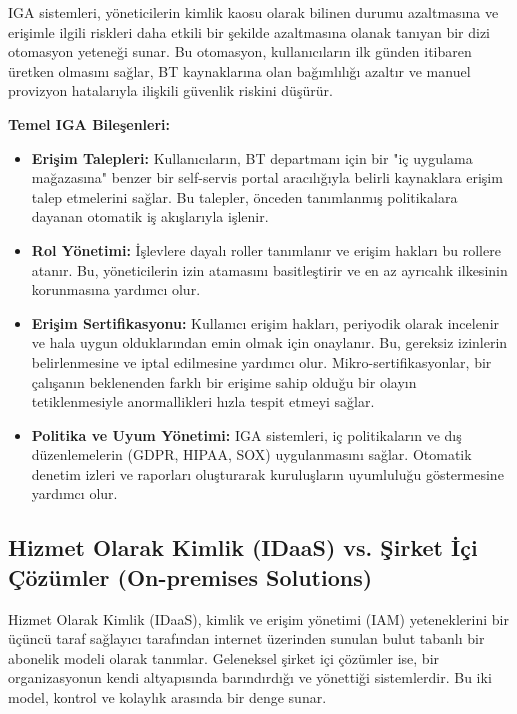 IGA sistemleri, yöneticilerin kimlik kaosu olarak bilinen durumu azaltmasına ve erişimle ilgili riskleri daha etkili bir şekilde azaltmasına olanak tanıyan bir dizi otomasyon yeteneği sunar. Bu otomasyon, kullanıcıların ilk günden itibaren üretken olmasını sağlar, BT kaynaklarına olan bağımlılığı azaltır ve manuel provizyon hatalarıyla ilişkili güvenlik riskini düşürür.

\textbf{Temel IGA Bileşenleri:}
\begin{itemize}
    \item \textbf{Erişim Talepleri:} Kullanıcıların, BT departmanı için bir "iç uygulama mağazasına" benzer bir self-servis portal aracılığıyla belirli kaynaklara erişim talep etmelerini sağlar. Bu talepler, önceden tanımlanmış politikalara dayanan otomatik iş akışlarıyla işlenir.
    \item \textbf{Rol Yönetimi:} İşlevlere dayalı roller tanımlanır ve erişim hakları bu rollere atanır. Bu, yöneticilerin izin atamasını basitleştirir ve en az ayrıcalık ilkesinin korunmasına yardımcı olur.
    \item \textbf{Erişim Sertifikasyonu:} Kullanıcı erişim hakları, periyodik olarak incelenir ve hala uygun olduklarından emin olmak için onaylanır. Bu, gereksiz izinlerin belirlenmesine ve iptal edilmesine yardımcı olur. Mikro-sertifikasyonlar, bir çalışanın beklenenden farklı bir erişime sahip olduğu bir olayın tetiklenmesiyle anormallikleri hızla tespit etmeyi sağlar.
    \item \textbf{Politika ve Uyum Yönetimi:} IGA sistemleri, iç politikaların ve dış düzenlemelerin (GDPR, HIPAA, SOX) uygulanmasını sağlar. Otomatik denetim izleri ve raporları oluşturarak kuruluşların uyumluluğu göstermesine yardımcı olur.
\end{itemize}

\subsection{Hizmet Olarak Kimlik (IDaaS) vs. Şirket İçi Çözümler (On-premises Solutions)}

Hizmet Olarak Kimlik (IDaaS), kimlik ve erişim yönetimi (IAM) yeteneklerini bir üçüncü taraf sağlayıcı tarafından internet üzerinden sunulan bulut tabanlı bir abonelik modeli olarak tanımlar. Geleneksel şirket içi çözümler ise, bir organizasyonun kendi altyapısında barındırdığı ve yönettiği sistemlerdir. Bu iki model, kontrol ve kolaylık arasında bir denge sunar.

